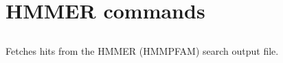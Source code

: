 

\section{HMMER commands}


\subsection[hmm\_score]{  }



Fetches hits from the HMMER (HMMPFAM) search output file.


